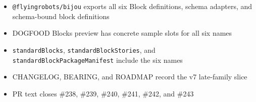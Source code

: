 \begin{itemize}
\tightlist
\item
  \texttt{@\allowbreak{}f\allowbreak{}l\allowbreak{}y\allowbreak{}i\allowbreak{}n\allowbreak{}g\allowbreak{}r\allowbreak{}o\allowbreak{}b\allowbreak{}o\allowbreak{}t\allowbreak{}s\allowbreak{}/\allowbreak{}b\allowbreak{}i\allowbreak{}j\allowbreak{}o\allowbreak{}u} exports all six Block definitions, schema adapters, and schema-bound block definitions
\item
  DOGFOOD Blocks preview has concrete sample slots for all six names
\item
  \texttt{s\allowbreak{}t\allowbreak{}a\allowbreak{}n\allowbreak{}d\allowbreak{}a\allowbreak{}r\allowbreak{}d\allowbreak{}B\allowbreak{}l\allowbreak{}o\allowbreak{}c\allowbreak{}k\allowbreak{}s}, \texttt{s\allowbreak{}t\allowbreak{}a\allowbreak{}n\allowbreak{}d\allowbreak{}a\allowbreak{}r\allowbreak{}d\allowbreak{}B\allowbreak{}l\allowbreak{}o\allowbreak{}c\allowbreak{}k\allowbreak{}S\allowbreak{}t\allowbreak{}o\allowbreak{}r\allowbreak{}i\allowbreak{}e\allowbreak{}s}, and \texttt{s\allowbreak{}t\allowbreak{}a\allowbreak{}n\allowbreak{}d\allowbreak{}a\allowbreak{}r\allowbreak{}d\allowbreak{}B\allowbreak{}l\allowbreak{}o\allowbreak{}c\allowbreak{}k\allowbreak{}P\allowbreak{}a\allowbreak{}c\allowbreak{}k\allowbreak{}a\allowbreak{}g\allowbreak{}e\allowbreak{}M\allowbreak{}a\allowbreak{}n\allowbreak{}i\allowbreak{}f\allowbreak{}e\allowbreak{}s\allowbreak{}t} include the six names
\item
  CHANGELOG, BEARING, and ROADMAP record the v7 late-family slice
\item
  PR text closes \#238, \#239, \#240, \#241, \#242, and \#243
\end{itemize}

